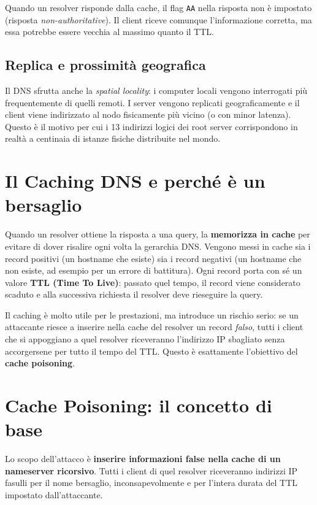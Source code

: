 \documentclass{article}
\begin{document}
Quando un resolver risponde dalla cache, il flag \texttt{AA} nella risposta
non è impostato (risposta \emph{non-authoritative}). Il client riceve comunque
l'informazione corretta, ma essa potrebbe essere vecchia al massimo quanto
il TTL.

\subsection*{Replica e prossimità geografica}

Il DNS sfrutta anche la \emph{spatial locality}: i computer locali vengono
interrogati più frequentemente di quelli remoti. I server vengono replicati
geograficamente e il client viene indirizzato al nodo fisicamente più vicino
(o con minor latenza). Questo è il motivo per cui i 13 indirizzi logici dei
root server corrispondono in realtà a centinaia di istanze fisiche distribuite
nel mondo.


\section*{Il Caching DNS e perché è un bersaglio}

Quando un resolver ottiene la risposta a una query, la \textbf{memorizza in
cache} per evitare di dover risalire ogni volta la gerarchia DNS. Vengono
messi in cache sia i record positivi (un hostname che esiste) sia i record
negativi (un hostname che non esiste, ad esempio per un errore di battitura).
Ogni record porta con sé un valore \textbf{TTL (Time To Live)}: passato quel
tempo, il record viene considerato scaduto e alla successiva richiesta il
resolver deve rieseguire la query.

Il caching è molto utile per le prestazioni, ma introduce un rischio serio:
se un attaccante riesce a inserire nella cache del resolver un record
\emph{falso}, tutti i client che si appoggiano a quel resolver riceveranno
l'indirizzo IP sbagliato senza accorgersene per tutto il tempo del TTL.
Questo è esattamente l'obiettivo del \textbf{cache poisoning}.

\section*{Cache Poisoning: il concetto di base}

Lo scopo dell'attacco è \textbf{inserire informazioni false nella cache di un
nameserver ricorsivo}. Tutti i client di quel resolver riceveranno indirizzi
IP fasulli per il nome bersaglio, inconsapevolmente e per l'intera durata
del TTL impostato dall'attaccante.
\end{document}
